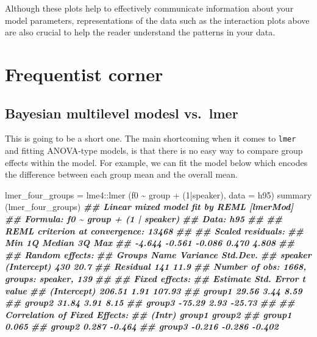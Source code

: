 \documentclass[
]{book}
\newenvironment{Shaded}{\begin{snugshade}}{\end{snugshade}}
\newcommand{\AttributeTok}[1]{\textcolor[rgb]{0.77,0.63,0.00}{#1}}
\newcommand{\DecValTok}[1]{\textcolor[rgb]{0.00,0.00,0.81}{#1}}
\newcommand{\DocumentationTok}[1]{\textcolor[rgb]{0.56,0.35,0.01}{\textbf{\textit{#1}}}}
\newcommand{\FunctionTok}[1]{\textcolor[rgb]{0.00,0.00,0.00}{#1}}
\newcommand{\NormalTok}[1]{#1}
\newcommand{\OtherTok}[1]{\textcolor[rgb]{0.56,0.35,0.01}{#1}}
\newcommand{\SpecialCharTok}[1]{\textcolor[rgb]{0.00,0.00,0.00}{#1}}
\begin{document}
Although these plots help to effectively communicate information about your model parameters, representations of the data such as the interaction plots above are also crucial to help the reader understand the patterns in your data.

\hypertarget{frequentist-corner-2}{%
\section{Frequentist corner}\label{frequentist-corner-2}}

\hypertarget{bayesian-multilevel-modesl-vs.-lmer-2}{%
\subsection{Bayesian multilevel modesl vs.~lmer}\label{bayesian-multilevel-modesl-vs.-lmer-2}}

This is going to be a short one. The main shortcoming when it comes to \texttt{lmer} and fitting ANOVA-type models, is that there is no easy way to compare group effects within the model. For example, we can fit the model below which encodes the difference between each group mean and the overall mean.

\begin{Shaded}
\begin{Highlighting}[]
\NormalTok{lmer\_four\_groups }\OtherTok{=}\NormalTok{ lme4}\SpecialCharTok{::}\FunctionTok{lmer}\NormalTok{ (f0 }\SpecialCharTok{\textasciitilde{}}\NormalTok{ group }\SpecialCharTok{+}\NormalTok{ (}\DecValTok{1}\SpecialCharTok{|}\NormalTok{speaker), }\AttributeTok{data =}\NormalTok{ h95)}
\FunctionTok{summary}\NormalTok{ (lmer\_four\_groups)}
\DocumentationTok{\#\# Linear mixed model fit by REML [\textquotesingle{}lmerMod\textquotesingle{}]}
\DocumentationTok{\#\# Formula: f0 \textasciitilde{} group + (1 | speaker)}
\DocumentationTok{\#\#    Data: h95}
\DocumentationTok{\#\# }
\DocumentationTok{\#\# REML criterion at convergence: 13468}
\DocumentationTok{\#\# }
\DocumentationTok{\#\# Scaled residuals: }
\DocumentationTok{\#\#    Min     1Q Median     3Q    Max }
\DocumentationTok{\#\# {-}4.644 {-}0.561 {-}0.086  0.470  4.808 }
\DocumentationTok{\#\# }
\DocumentationTok{\#\# Random effects:}
\DocumentationTok{\#\#  Groups   Name        Variance Std.Dev.}
\DocumentationTok{\#\#  speaker  (Intercept) 430      20.7    }
\DocumentationTok{\#\#  Residual             141      11.9    }
\DocumentationTok{\#\# Number of obs: 1668, groups:  speaker, 139}
\DocumentationTok{\#\# }
\DocumentationTok{\#\# Fixed effects:}
\DocumentationTok{\#\#             Estimate Std. Error t value}
\DocumentationTok{\#\# (Intercept)   206.51       1.91  107.93}
\DocumentationTok{\#\# group1         29.56       3.44    8.59}
\DocumentationTok{\#\# group2         31.84       3.91    8.15}
\DocumentationTok{\#\# group3        {-}75.29       2.93  {-}25.73}
\DocumentationTok{\#\# }
\DocumentationTok{\#\# Correlation of Fixed Effects:}
\DocumentationTok{\#\#        (Intr) group1 group2}
\DocumentationTok{\#\# group1  0.065              }
\DocumentationTok{\#\# group2  0.287 {-}0.464       }
\DocumentationTok{\#\# group3 {-}0.216 {-}0.286 {-}0.402}
\end{Highlighting}
\end{Shaded}
\end{document}
